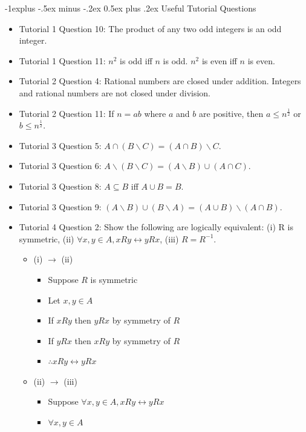 \documentclass[10pt, portrait]{article}
\makeatletter
\renewcommand{\section}{\@startsection{section}{1}{0mm}%
                                {-1ex plus -.5ex minus -.2ex}%
                                {0.5ex plus .2ex}%
                                {\normalfont\large\bfseries}}
\renewcommand{\section}{\@startsection{section}{2}{0mm}%
                                {-1explus -.5ex minus -.2ex}%
                                {0.5ex plus .2ex}%
                                {\normalfont\normalsize\bfseries}}
\makeatother
\begin{document}
\begin{multicols*}{2}
\section{Useful Tutorial Questions}
\begin{itemize}
    \item Tutorial 1 Question 10: The product of any two odd integers is an odd integer.
    \item Tutorial 1 Question 11: $n^2$ is odd iff $n$ is odd. $n^2$ is even iff $n$ is even.
    \item Tutorial 2 Question 4: Rational numbers are closed under addition. Integers and rational numbers are not closed under division.
    \item Tutorial 2 Question 11: If $n = ab$ where $a$ and $b$ are positive, then $a \leq n^\frac{1}{2}$ or $b \leq n^\frac{1}{2}$.
    \item Tutorial 3 Question 5: $A \cap (B \backslash C) = (A \cap B) \backslash C$.
    \item Tutorial 3 Question 6: $A \backslash (B \backslash C) = (A \backslash B) \cup (A \cap C)$.
    \item Tutorial 3 Question 8: $A \subseteq B$ iff $A \cup B = B$.
    \item Tutorial 3 Question 9: $(A \backslash B) \cup (B \backslash A) = (A \cup B) \backslash (A \cap B)$.
    \item Tutorial 4 Question 2: Show the following are logically equivalent: (i) R is symmetric, (ii) $\forall x, y \in A, x R y \leftrightarrow y R x$, (iii) $R = R^{-1}$.
    \begin{itemize}
        \item (i) $\rightarrow$ (ii)
        \begin{itemize}
            \item Suppose $R$ is symmetric
            \item Let $x, y \in A$
            \item If $x R y$ then $y R x$ by symmetry of $R$
            \item If $y R x$ then $x R y$ by symmetry of $R$
            \item $\therefore x R y \leftrightarrow y R x$
        \end{itemize}
        \item (ii) $\rightarrow$ (iii)
        \begin{itemize}
            \item Suppose $\forall x, y \in A, x R y \leftrightarrow y R x$
            \item $\forall x, y \in A$

\end{itemize}
\end{itemize}
\end{itemize}
\end{multicols*}
\end{document}
